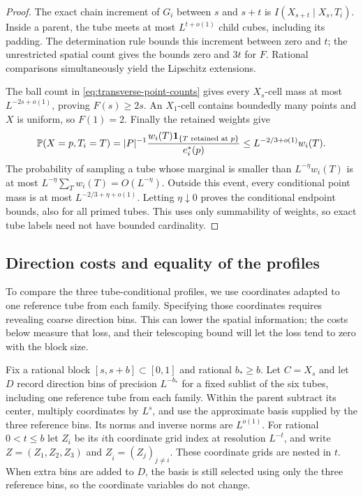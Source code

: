 \begin{proof}
The exact chain increment of $G_i$ between $s$ and $s+t$ is
$I(X_{s+t}\mid X_s,T_i)$.  Inside a parent, the tube meets at most
$L^{t+o(1)}$ child cubes, including its padding.  The determination
rule bounds this increment between zero and $t$; the unrestricted
spatial count gives the bounds zero and $3t$ for $F$.  Rational
comparisons simultaneously yield the Lipschitz extensions.

The ball count in \eqref{eq:transverse-point-counts} gives every
$X_s$-cell mass at most $L^{-2s+o(1)}$, proving $F(s)\ge2s$.
An $X_1$-cell contains boundedly many points and $X$ is uniform, so
$F(1)=2$.  Finally the retained weights give
\[
 \mathbb P(X=p,T_i=T)
   =|P|^{-1}\frac{w_i(T)\mathbf1_{\{T\text{ retained at }p\}}}
                      {e_i^*(p)}
   \le L^{-2/3+o(1)}w_i(T).
\]
The probability of sampling a tube whose marginal is smaller than
$L^{-\eta}w_i(T)$ is at most
$L^{-\eta}\sum_Tw_i(T)=O(L^{-\eta})$.  Outside this event, every
conditional point mass is at most $L^{-2/3+\eta+o(1)}$.
Letting $\eta\downarrow0$ proves the conditional endpoint bounds,
also for all primed tubes.  This uses only summability of weights,
so exact tube labels need not have bounded cardinality.
\end{proof}

\subsection{Direction costs and equality of the profiles}

To compare the three tube-conditional profiles, we use coordinates
adapted to one reference tube from each family.  Specifying those
coordinates requires revealing coarse direction bins.  This can lower
the spatial information; the costs below measure that loss, and their
telescoping bound will let the loss tend to zero with the block size.

Fix a rational block $[s,s+b]\subset[0,1]$ and rational $b_*\ge b$.
Let $C=X_s$ and let $D$ record direction bins of precision $L^{-b_*}$
for a fixed sublist of the six tubes, including one reference tube
from each family.  Within the parent subtract its center, multiply
coordinates by $L^s$, and use the approximate basis supplied by the
three reference bins.  Its norms and inverse norms are $L^{o(1)}$.
For rational $0<t\le b$ let $Z_i$ be its $i$th coordinate grid index
at resolution $L^{-t}$, and write $Z=(Z_1,Z_2,Z_3)$ and
$Z_{\widehat i}=(Z_j)_{j\ne i}$.  These coordinate grids are nested
in $t$.  When extra bins are added to $D$, the basis is still selected
using only the three reference bins, so the coordinate variables do
not change.

